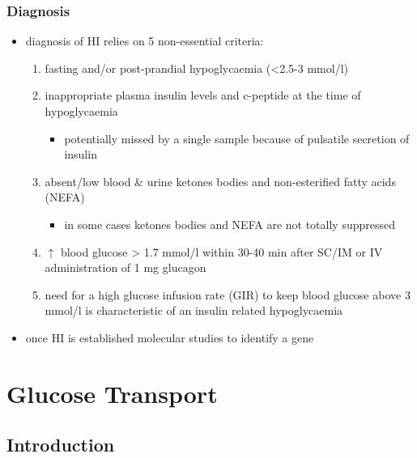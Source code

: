 \documentclass{scrartcl}
\begin{document}
\subsubsection{Diagnosis}
\label{sec:orge811d73}
\begin{itemize}
\item diagnosis of HI relies on 5 non-essential criteria:
\begin{enumerate}
\item fasting and/or post-prandial hypoglycaemia (<2.5-3 mmol/l)
\item inappropriate plasma insulin levels and c-peptide at the time of
hypoglycaemia
\begin{itemize}
\item potentially missed by a single sample because of pulsatile
secretion of insulin
\end{itemize}
\item absent/low blood \& urine ketones bodies and non-esterified fatty
acids (NEFA)
\begin{itemize}
\item in some cases ketones bodies and NEFA are not totally
suppressed
\end{itemize}
\item \(\uparrow\) blood glucose \textgreater{} 1.7 mmol/l within 30-40 min after
SC/IM or IV administration of 1 mg glucagon
\item need for a high glucose infusion rate (GIR) to keep blood
glucose above 3 mmol/l is characteristic of an insulin related
hypoglycaemia
\end{enumerate}

\item once HI is established molecular studies to identify a gene
\end{itemize}

\section{Glucose Transport}
\label{sec:orga1fbaca}
\subsection{Introduction}
\label{sec:org2e91a5f}
\end{document}
